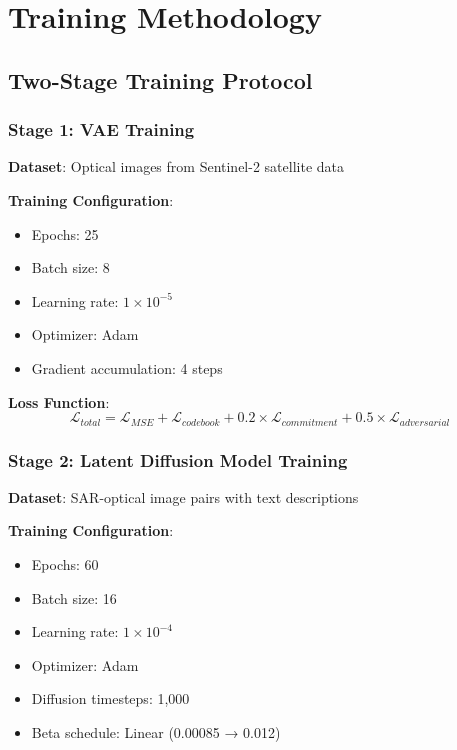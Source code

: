 \section{Training Methodology}

\subsection{Two-Stage Training Protocol}

\subsubsection{Stage 1: VAE Training}

\textbf{Dataset}: Optical images from Sentinel-2 satellite data

\textbf{Training Configuration}:
\begin{itemize}
    \item Epochs: 25
    \item Batch size: 8
    \item Learning rate: $1 \times 10^{-5}$
    \item Optimizer: Adam
    \item Gradient accumulation: 4 steps
\end{itemize}

\textbf{Loss Function}:
\begin{equation}
\mathcal{L}_{total} = \mathcal{L}_{MSE} + \mathcal{L}_{codebook} + 0.2 \times \mathcal{L}_{commitment} + 0.5 \times \mathcal{L}_{adversarial}
\end{equation}

\subsubsection{Stage 2: Latent Diffusion Model Training}

\textbf{Dataset}: SAR-optical image pairs with text descriptions

\textbf{Training Configuration}:
\begin{itemize}
    \item Epochs: 60
    \item Batch size: 16
    \item Learning rate: $1 \times 10^{-4}$
    \item Optimizer: Adam
    \item Diffusion timesteps: 1,000
    \item Beta schedule: Linear (0.00085 → 0.012)
\end{itemize}

